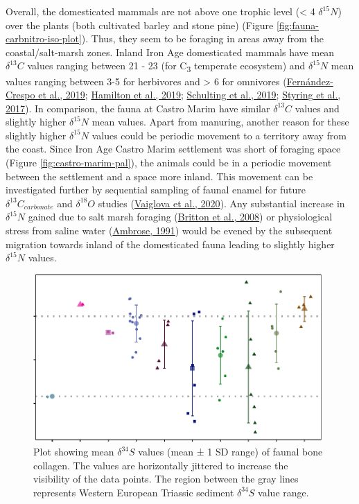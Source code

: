 \documentclass[preprint, 3p, authoryear]{elsarticle} %
\begin{document}
Overall, the domesticated mammals are not above one trophic level (\textless{} 4\text{\textperthousand} \(\delta^{15}N\)) over the plants (both cultivated barley and stone pine) (Figure \ref{fig:fauna-carbnitro-iso-plot}). Thus, they seem to be foraging in areas away from the coastal/salt-marsh zones. Inland Iron Age domesticated mammals have mean \(\delta ^{13}C\) values ranging between 21 - 23\text{\textperthousand} (for C\textsubscript{3} temperate ecosystem) and \(\delta ^{15}N\) mean values ranging between 3-5\text{\textperthousand} for herbivores and \textgreater{} 6\text{\textperthousand} for omnivores (\protect\hyperlink{ref-fernandez-crespo_etal19}{Fernández-Crespo et al., 2019}; \protect\hyperlink{ref-hamilton_etal19}{Hamilton et al., 2019}; \protect\hyperlink{ref-schulting_etal19}{Schulting et al., 2019}; \protect\hyperlink{ref-styring_etal17}{Styring et al., 2017}). In comparison, the fauna at Castro Marim have similar \(\delta ^{13}C\) values and slightly higher \(\delta ^{15}N\) mean values. Apart from manuring, another reason for these slightly higher \(\delta^{15}N\) values could be periodic movement to a territory away from the coast. Since Iron Age Castro Marim settlement was short of foraging space (Figure \ref{fig:castro-marim-pal}), the animals could be in a periodic movement between the settlement and a space more inland. This movement can be investigated further by sequential sampling of faunal enamel for future \(\delta^{13}C_{carbonate}\) and \(\delta^{18}O\) studies (\protect\hyperlink{ref-vaiglova_etal20}{Vaiglova et al., 2020}). Any substantial increase in \(\delta^{15}N\) gained due to salt marsh foraging (\protect\hyperlink{ref-britton_etal08}{Britton et al., 2008}) or physiological stress from saline water (\protect\hyperlink{ref-ambrose91}{Ambrose, 1991}) would be evened by the subsequent migration towards inland of the domesticated fauna leading to slightly higher \(\delta ^{15}N\) values.



\begin{figure}
\includegraphics[width=0.98\textwidth]{RPaladuguetal_Castro_files/figure-latex/fauna-sulph-iso-plot-1} \caption{Plot showing mean \(\delta ^{34}S\) values (mean ± 1 SD range) of faunal bone collagen. The values are horizontally jittered to increase the visibility of the data points. The region between the gray lines represents Western European Triassic sediment \(\delta ^{34}S\) value range.}\label{fig:fauna-sulph-iso-plot}
\end{figure}
\end{document}
